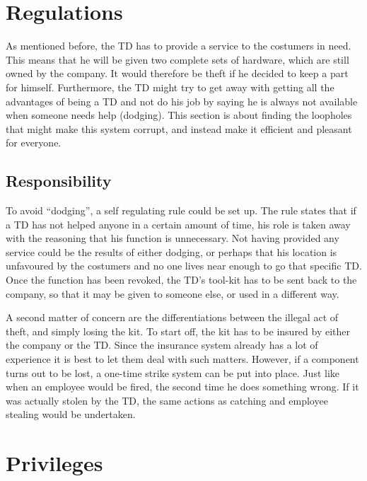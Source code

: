 \documentclass[final]{scrreprt} %
\begin{document}

\section{Regulations}\label{sec:regulations}
As mentioned before, the TD has to provide a service to the costumers in need. This means that he will be given two complete sets of hardware, which are still owned by the company. It would therefore be theft if he decided to keep a part for himself. Furthermore, the TD might try to get away with getting all the advantages of being a TD and not do his job by saying he is always not available when someone needs help (dodging). This section is about finding the loopholes that might make this system corrupt, and instead make it efficient and pleasant for everyone.

\subsection{Responsibility}
To avoid ``dodging'', a self regulating rule could be set up. The rule states that if a TD has not helped anyone in a certain amount of time, his role is taken away with the reasoning that his function is unnecessary. Not having provided any service could be the results of either dodging, or perhaps that his location is unfavoured by the costumers and no one lives near enough to go that specific TD. Once the function has been revoked, the TD's tool-kit has to be sent back to the company, so that it may be given to someone else, or used in a different way.

A second matter of concern are the differentiations between the illegal act of theft, and simply losing the kit. To start off, the kit has to be insured by either the company or the TD. Since the insurance system already has a lot of experience it is best to let them deal with such matters. However, if a component turns out to be lost, a one-time strike system can be put into place. Just like when an employee would be fired, the second time he does something wrong. If it was actually stolen by the TD, the same actions as catching and employee stealing would be undertaken. 

\section{Privileges} 

\end{document}
